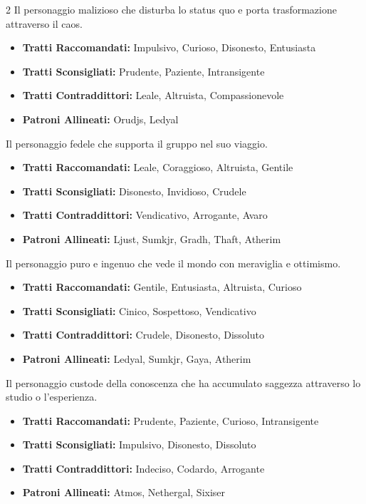 \begin{multicols}{2}
Il personaggio malizioso che disturba lo status quo e porta trasformazione attraverso il caos.

\noindent\begin{itemize}[leftmargin=*] \setlength{\itemsep}{0pt}
\item \textbf{Tratti Raccomandati:} Impulsivo, Curioso, Disonesto, Entusiasta
\item \textbf{Tratti Sconsigliati:} Prudente, Paziente, Intransigente
\item \textbf{Tratti Contraddittori:} Leale, Altruista, Compassionevole
\item \textbf{Patroni Allineati:} Orudjs, Ledyal
\end{itemize}

Il personaggio fedele che supporta il gruppo nel suo viaggio.

\noindent\begin{itemize}[leftmargin=*] \setlength{\itemsep}{0pt}
\item \textbf{Tratti Raccomandati:} Leale, Coraggioso, Altruista, Gentile
\item \textbf{Tratti Sconsigliati:} Disonesto, Invidioso, Crudele
\item \textbf{Tratti Contraddittori:} Vendicativo, Arrogante, Avaro
\item \textbf{Patroni Allineati:} Ljust, Sumkjr, Gradh, Thaft, Atherim
\end{itemize}

Il personaggio puro e ingenuo che vede il mondo con meraviglia e ottimismo.

\noindent\begin{itemize}[leftmargin=*] \setlength{\itemsep}{0pt}
\item \textbf{Tratti Raccomandati:} Gentile, Entusiasta, Altruista, Curioso
\item \textbf{Tratti Sconsigliati:} Cinico, Sospettoso, Vendicativo
\item \textbf{Tratti Contraddittori:} Crudele, Disonesto, Dissoluto
\item \textbf{Patroni Allineati:} Ledyal, Sumkjr, Gaya, Atherim
\end{itemize}

Il personaggio custode della conoscenza che ha accumulato saggezza attraverso lo studio o l'esperienza.

\noindent\begin{itemize}[leftmargin=*] \setlength{\itemsep}{0pt}
\item \textbf{Tratti Raccomandati:} Prudente, Paziente, Curioso, Intransigente
\item \textbf{Tratti Sconsigliati:} Impulsivo, Disonesto, Dissoluto
\item \textbf{Tratti Contraddittori:} Indeciso, Codardo, Arrogante
\item \textbf{Patroni Allineati:} Atmos, Nethergal, Sixiser
\end{itemize}


\end{multicols}
